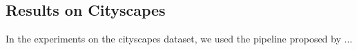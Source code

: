 \subsection{Results on Cityscapes}
In the experiments on the cityscapes dataset, we used the pipeline proposed by \cite{liu2018affinity} ...









